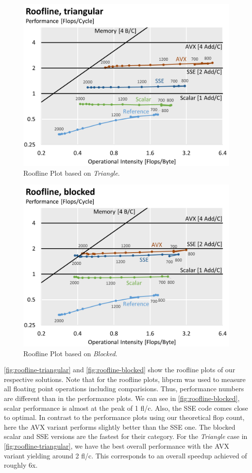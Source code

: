 \begin{figure}[htb]\centering
  \includegraphics[width=\linewidth]{roofline-data/roofline_triangular.png}
  \caption{Roofline Plot based on \emph{Triangle}.}
  \label{fig:roofline-triangular}
\end{figure}
\begin{figure}[htb]\centering
  \includegraphics[width=\linewidth]{roofline-data/roofline_blocked.png}
  \caption{Roofline Plot based on \emph{Blocked}.}
  \label{fig:roofline-blocked}
\end{figure}
\autoref{fig:roofline-triangular} and \autoref{fig:roofline-blocked} show
the roofline plots of our respective solutions. Note that for the roofline
plots, libpcm was used to measure all floating point operations including
comparisions. Thus, performance numbers are different than in the
performance plots. We can see in \autoref{fig:roofline-blocked}, scalar
performance is almost at the peak of 1 fl/c. Also, the SSE code comes close
to optimal. In contrast to the performance plots using our theoretical flop
count, here the AVX variant performs slightly better than the SSE one. The
blocked scalar and SSE versions are the fastest for their category. For the
\emph{Triangle} case in \autoref{fig:roofline-triangular}, we have the best
overall performance with the AVX variant yielding around 2 fl/c. This
corresponds to an overall speedup achieved of roughly 6x.

